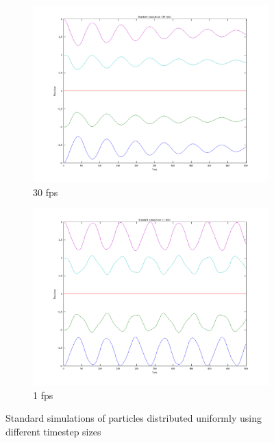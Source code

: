 \documentclass[11pt]{article}
\begin{document}
\begin{figure}[H]
    \begin{subfigure}{0.5\textwidth}
        \includegraphics[width=\textwidth]{../images/standard_uniform_30fps.png}
        \caption{30 fps}
        \label{fig:std_uni_30fps}
    \end{subfigure}
    \begin{subfigure}{0.5\textwidth}
        \includegraphics[width=\textwidth]{../images/standard_uniform_1fps.png}
        \caption{1 fps}
        \label{fig:std_uni_1fps}
    \end{subfigure}
    \caption{Standard simulations of particles distributed uniformly using
    different timestep sizes}
\end{figure}
\end{document}
